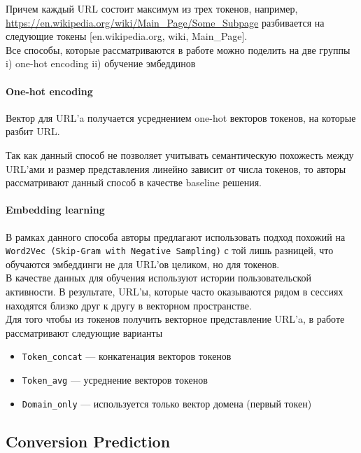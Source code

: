 Причем каждый URL состоит максимум из трех токенов, например, \url{https://en.wikipedia.org/wiki/Main_Page/Some\_Subpage} разбивается на следующие токены
  [en.wikipedia.org, wiki, Main\_Page]. \\

Все способы, которые рассматриваются в работе можно поделить на две группы i) one-hot encoding ii) обучение эмбеддинов

\paragraph{One-hot encoding} Вектор для URL'a получается усреднением one-hot векторов токенов, на которые разбит URL.

Так как данный способ не позволяет учитывать семантическую похожесть между URL'ами и размер представления линейно зависит от числа токенов, то авторы рассматривают данный способ в качестве baseline решения.

\paragraph{Embedding learning} В рамках данного способа авторы предлагают использовать подход похожий на \texttt{Word2Vec (Skip-Gram with Negative Sampling)} с той лишь разницей, что обучаются эмбеддинги не для URL'ов целиком, но для токенов. \\

В качестве данных для обучения используют истории пользовательской активности. В результате, URL'ы, которые часто оказываются рядом в сессиях находятся близко друг к другу в векторном пространстве. \\

Для того чтобы из токенов получить векторное представление URL'a, в работе рассматривают следующие варианты
\begin{itemize}
    \item \texttt{Token\_concat} --- конкатенация векторов токенов
    \item \texttt{Token\_avg} --- усреднение векторов токенов
    \item \texttt{Domain\_only} --- используется только вектор домена (первый токен)
\end{itemize}

\subsection*{Conversion Prediction}

